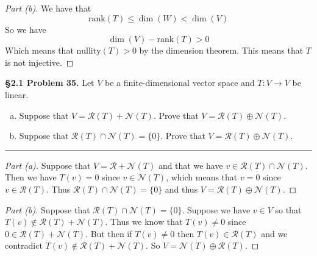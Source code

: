 \documentclass[leqno]{article}
\theoremstyle{nonumberplain}
\newtheorem{proof}{Proof}
\begin{document}
\begin{proof}[Part (b)]
We have that
\[
\textrm{rank}(T)\leq \dim(W)<\dim(V)
\]
So we have
\[
\dim(V)-\textrm{rank}(T)>0
\]
Which means that $\textrm{nullity}(T)>0$ by the dimension theorem. This means that $T$ is not injective.
\end{proof}

\pagebreak




\noindent\textbf{\S 2.1 Problem 35.} Let $V$ be a finite-dimensional vector space and $T\colon V \to V$ be linear.
\begin{enumerate}[(a)]
\item Suppose that $V=\mathcal{R}(T)+\mathcal{N}(T)$. Prove that $V=\mathcal{R}(T)\oplus \mathcal{N}(T)$.
\item Suppose that $\mathcal{R}(T)\cap \mathcal{N}(T)=\{0\}$. Prove that $V=\mathcal{R}(T)\oplus \mathcal{N}(T)$.
\end{enumerate}

\noindent\rule[0.5ex]{\linewidth}{1pt}

\begin{proof}[Part (a)]
Suppose that $V=\mathcal{R}+\mathcal{N}(T)$ and that we have $v\in \mathcal{R}(T)\cap \mathcal{N}(T)$.  Then we have $T(v)=0$ since $v\in \mathcal{N}(T)$, which means that $v=0$ since $v\in \mathcal{R}(T)$. Thus $\mathcal{R}(T)\cap\mathcal{N}(T)=\{0\}$ and thus $V=\mathcal{R}(T)\oplus \mathcal{N}(T)$.
\end{proof}

\begin{proof}[Part (b)]
Suppose that $\mathcal{R}(T)\cap \mathcal{N}(T)=\{0\}$. Suppose we have $v\in V$ so that $T(v)\notin \mathcal{R}(T)+\mathcal{N}(T)$. Thus we know that $T(v)\neq 0$ since $0\in \mathcal{R}(T)+\mathcal{N}(T)$. But then if $T(v)\neq 0$ then $T(v)\in \mathcal{R}(T)$ and we contradict $T(v)\notin \mathcal{R}(T)+\mathcal{N}(T)$. So $V=\mathcal{N}(T)\oplus \mathcal{R}(T)$.
\end{proof}

\pagebreak


\end{document}
